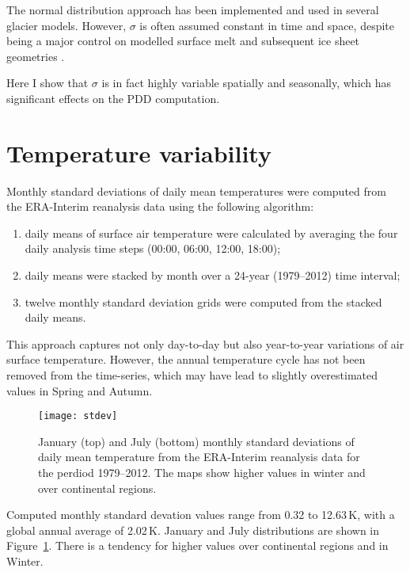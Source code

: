 \documentclass[twocolumn]{igs}
\begin{document}
The normal distribution approach has been implemented and used in several glacier models. However, $\sigma$ is often assumed constant in time and space, despite being a major control on modelled surface melt and subsequent ice sheet geometries \citep{charbit-etal-2013}.

Here I show that $\sigma$ is in fact highly variable spatially and seasonally, which has significant effects on the PDD computation.


\section{Temperature variability}

Monthly standard deviations of daily mean temperatures were computed from the ERA-Interim reanalysis \citep{data:erai} data using the following algorithm:

\begin{enumerate}
  \item daily means of surface air temperature were calculated by averaging the four daily analysis time steps (00:00, 06:00, 12:00, 18:00);
  \item daily means were stacked by month over a 24-year (1979--2012) time interval;
  \item twelve monthly standard deviation grids were computed from the stacked daily means.
\end{enumerate}

This approach captures not only day-to-day but also year-to-year variations of air surface temperature. However, the annual temperature cycle has not been removed from the time-series, which may have lead to slightly overestimated values in Spring and Autumn.

\begin{figure}
  \centering\texttt{[image: stdev]}
  \caption{January (top) and July (bottom) monthly standard deviations of daily mean temperature from the ERA-Interim reanalysis \citep{data:erai} data for the perdiod 1979--2012. The maps show higher values in winter and over continental regions.}
  \label{fig:stdev}
\end{figure}

Computed monthly standard devation values range from 0.32 to 12.63\,K, with a global annual average of 2.02\,K. January and July distributions are shown in Figure~\ref{fig:stdev}. There is a tendency for higher values over continental regions and in Winter.
\end{document}
